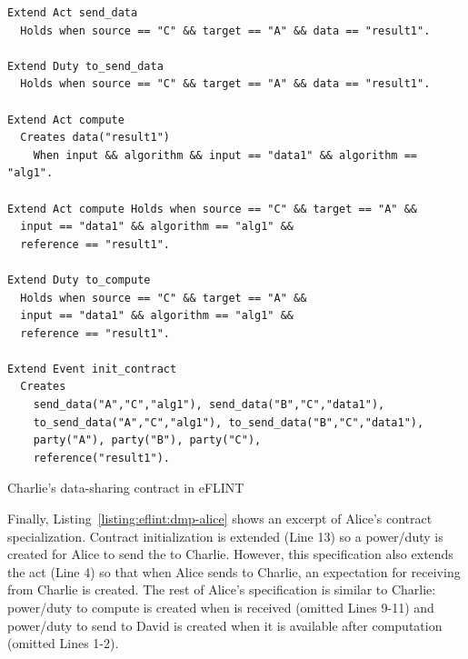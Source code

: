 \begin{listing}[h]
\centering
\begin{tcolorbox}[left=2pt,right=2pt,top=2pt,bottom=2pt]
\begin{verbatim}
Extend Act send_data
  Holds when source == "C" && target == "A" && data == "result1".

Extend Duty to_send_data
  Holds when source == "C" && target == "A" && data == "result1".

Extend Act compute
  Creates data("result1")
    When input && algorithm && input == "data1" && algorithm == "alg1".

Extend Act compute Holds when source == "C" && target == "A" &&
  input == "data1" && algorithm == "alg1" &&
  reference == "result1".

Extend Duty to_compute
  Holds when source == "C" && target == "A" &&
  input == "data1" && algorithm == "alg1" &&
  reference == "result1".

Extend Event init_contract
  Creates 
    send_data("A","C","alg1"), send_data("B","C","data1"),
    to_send_data("A","C","alg1"), to_send_data("B","C","data1"), 
    party("A"), party("B"), party("C"), 
    reference("result1").
\end{verbatim}
\end{tcolorbox}
\caption{Charlie's data-sharing contract in eFLINT}
\label{listing:eflint:dmp-charlie}
\end{listing}
Finally, Listing~\ref{listing:eflint:dmp-alice} shows an excerpt of Alice's contract specialization. Contract initialization is extended (Line 13) so a power/duty is created for Alice to send the  to Charlie. However, this specification also extends the  act (Line 4) so that when Alice sends  to Charlie, an expectation for receiving  from Charlie is created. The rest of Alice's specification is similar to Charlie: power/duty to compute  is created when  is received (omitted Lines 9-11) and power/duty to send  to David is created when it is available after computation (omitted Lines 1-2). 


